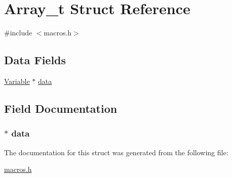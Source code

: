 \hypertarget{struct_array__t}{}\section{Array\+\_\+t Struct Reference}
\label{struct_array__t}


{\ttfamily \#include $<$macros.\+h$>$}

\subsection*{Data Fields}
\begin{DoxyCompactItemize}
\item 
\hyperlink{macros_8h_ae55f415df9a35d64f8a56b9de13845c1}{Variable} $\ast$ \hyperlink{struct_array__t_a06926f664b3b30cc6025307b59b490d5}{data}
\end{DoxyCompactItemize}


\subsection{Field Documentation}
\hypertarget{struct_array__t_a06926f664b3b30cc6025307b59b490d5}{}
\subsubsection[{data}]{$\ast$ data}\label{struct_array__t_a06926f664b3b30cc6025307b59b490d5}


The documentation for this struct was generated from the following file\+:\begin{DoxyCompactItemize}
\item 
\hyperlink{macros_8h}{macros.\+h}\end{DoxyCompactItemize}
